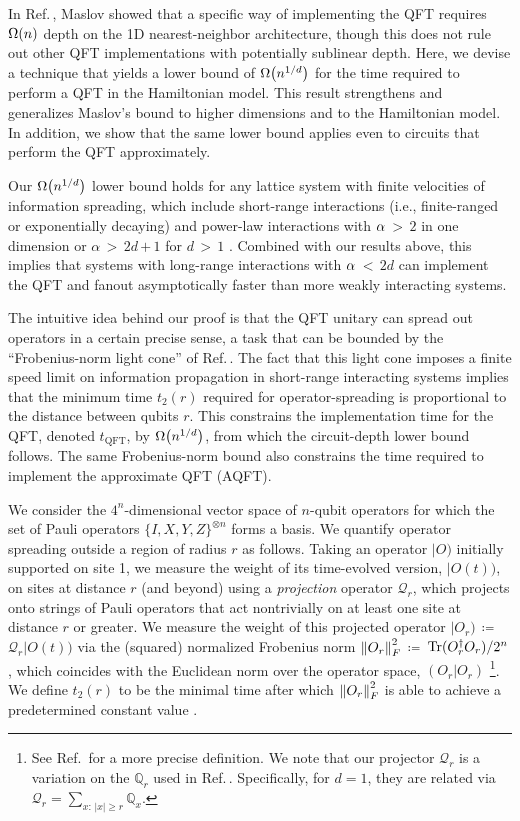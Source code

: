 In Ref.\,\cite{Maslov2007}, Maslov showed that a specific way of implementing the QFT requires $\W n$ depth on the 1D  nearest-neighbor architecture, though this does not rule out other QFT implementations with potentially sublinear depth.
Here, we devise a technique that yields a lower bound of $\W {n^{1/d}}$ for the time required to perform a QFT in the Hamiltonian model.
This result strengthens and generalizes Maslov's bound to higher dimensions and to the Hamiltonian model.
In addition, we show that the same lower bound applies even to circuits that perform the QFT approximately.

Our $\W {n^{1/d}}$ lower bound holds for any lattice system with finite velocities of information spreading, which include short-range interactions (i.e., finite-ranged or exponentially decaying) and power-law interactions with $\alpha$\,$>$\,$2$ in one dimension or $\alpha$\,$>$\,$2d$\,$+$\,$1$ for $d$\,$>$\,$1$ \cite{Lieb1972,Chen2019,kuwaharaStrictlyLinearLight2020}.
Combined with our results above, this implies that systems with long-range interactions with $\alpha$\,$<$\,$2d$ can implement the QFT and fanout asymptotically faster than more weakly interacting systems.

The intuitive idea behind our proof is that the QFT unitary can spread out operators in a certain precise sense, a task that can be bounded by the ``Frobenius-norm light cone'' of Ref.\,\cite{Tran2020hierarchylinearlightcones}.
The fact that this light cone imposes a finite speed limit on information propagation in short-range interacting systems implies that the minimum time $t_2(r)$ required for operator-spreading is proportional to the distance between qubits $r$.
This constrains the implementation time for the QFT, denoted $t_\mathrm{QFT}$, by $\W {n^{1/d}}$, from which the circuit-depth lower bound follows.
The same Frobenius-norm bound also constrains the time required to implement the approximate QFT (AQFT).

We consider the $4^n$-dimensional vector space of $n$-qubit operators for which the set of Pauli operators $\{I,X,Y,Z\}^{\otimes n}$ forms a basis.
We quantify operator spreading outside a region of radius $r$ as follows.
Taking an operator $|O)$ initially supported on site 1, we measure the weight of its time-evolved version, $|O(t))$, on sites at distance $r$ (and beyond) using a \emph{projection} operator $\mathcal{Q}_{r}$, which projects onto strings of Pauli operators that act nontrivially on at least one site at distance $r$ or greater.
We measure the weight of this projected operator $|O_r)$\,$\coloneqq$\,$\mathcal{Q}_{r}|O(t))$ via the (squared) normalized Frobenius norm $\left\|O_r\right\|_F^2$\,$\coloneqq$\,$\mathrm{Tr}(O_r^\dag O_r)/2^n$, which coincides with the Euclidean norm over the operator space, $(O_r|O_r)$ \footnote{See Ref.\,\cite{Tran2020a} for a more precise definition.
    We note that our projector $\mathcal{Q}_r$ is a variation on the $\mathbb{Q}_r$ used in {Ref.\,\cite{Tran2020a}}.
    Specifically, for $d=1$, they are related via $\mathcal{Q}_r = \sum_{x:\,|x|\ge r} \mathbb{Q}_x$.}.
We define $t_2(r)$ to be the minimal time after which $\left\|O_r\right\|_F^2$ is able to achieve a predetermined constant value \cite{Tran2020hierarchylinearlightcones}.


